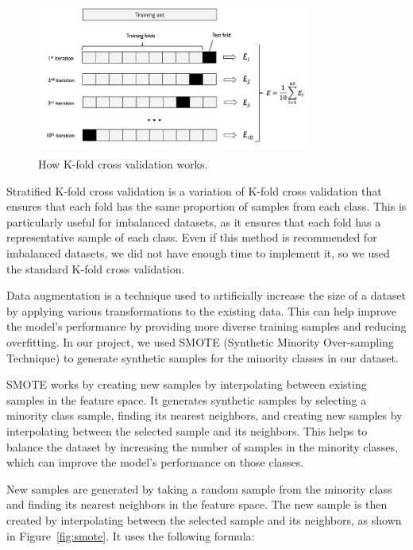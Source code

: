 \begin{figure}[htbp]
	\centering
	\includegraphics[width=0.8\textwidth]{../imgs/kfold.png}
	\caption{How K-fold cross validation works.\textsuperscript{\cite{Raschka-Mirjalili-2017}}}
	\label{fig:k_fold}
\end{figure}

\label{subsubsec:stratified_k_fold_cross_validation}

Stratified K-fold cross validation is a variation of K-fold cross validation that ensures that each fold has the same proportion of samples
from each class. This is particularly useful for imbalanced datasets, as it ensures that each fold has a representative sample of each class.
Even if this method is recommended for imbalanced datasets, we did not have enough time to implement it, so we used the standard K-fold cross
validation.

\label{subsubsec:smote}

Data augmentation is a technique used to artificially increase the size of a dataset by applying various transformations to the existing data.
This can help improve the model's performance by providing more diverse training samples and reducing overfitting. In our project, we used SMOTE
(Synthetic Minority Over-sampling Technique) to generate synthetic samples for the minority classes in our dataset.

SMOTE works by creating new samples by interpolating between existing samples in the feature space. It generates synthetic samples by selecting
a minority class sample, finding its nearest neighbors, and creating new samples by interpolating between the selected sample and its neighbors.
This helps to balance the dataset by increasing the number of samples in the minority classes, which can improve the model's performance on those
classes.

New samples are generated by taking a random sample from the minority class and finding its nearest neighbors in the feature space. The new sample
is then created by interpolating between the selected sample and its neighbors, as shown in Figure~\ref{fig:smote}. It uses the following formula:

